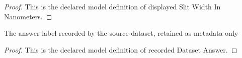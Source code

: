 \begin{proof}
  This is the declared model definition of displayed Slit Width In Nanometers.
\end{proof}
\begin{definition}
  \label{def:physics:phyx-mini-0047:phyxminiproblems-problemphyxmini0047-recordeddatasetanswer}
  The answer label recorded by the source dataset, retained as metadata only
\end{definition}
\begin{proof}
  This is the declared model definition of recorded Dataset Answer.
\end{proof}
